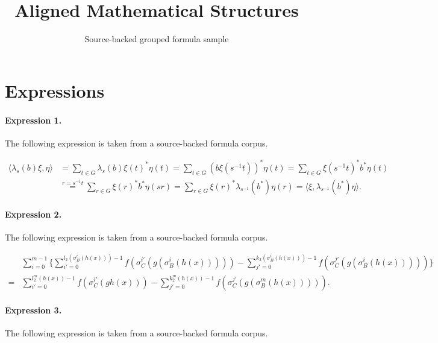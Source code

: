\documentclass[11pt]{article}
\title{Aligned Mathematical Structures}
\author{Source-backed grouped formula sample}
\date{}
\begin{document}
\maketitle
\section{Expressions}
\paragraph{Expression 1.} The following expression is taken from a source-backed formula corpus.

\begin{align*}\langle\lambda_s(b)\xi,\eta\rangle&=\sum_{t\in G}\lambda_s(b)\xi(t)^*\eta(t)=\sum_{t\in G}(b\xi(s^{-1}t))^*\eta(t)=\sum_{t\in G}\xi(s^{-1}t)^*b^*\eta(t)\\&\stackrel{r=s^{-1}t}{=}\sum_{r\in G}\xi(r)^*b^*\eta(sr)=\sum_{r\in G}\xi(r)^*\lambda_{s^{-1}}(b^*)\eta(r)=\langle\xi, \lambda_{s^{-1}}(b^*)\eta\rangle.\end{align*}

\paragraph{Expression 2.} The following expression is taken from a source-backed formula corpus.

\begin{align*}& \sum_{i=0}^{m-1} \{\sum_{i'=0}^{l_2 (\sigma_B^i(h(x)))-1} f(\sigma_C^{i'}(g(\sigma_B^i(h(x)))))-\sum_{j'=0}^{k_2 (\sigma_B^i(h(x)))-1} f(\sigma_C^{j'}(g(\sigma_B^{i}(h(x))))) \}\\=&\sum_{i'=0}^{l_2^m (h(x))-1} f(\sigma_C^{i'}(gh(x)))-\sum_{j'=0}^{k_2^m (h(x))-1} f(\sigma_C^{j'}(g(\sigma_B^{m}(h(x))))).\end{align*}

\paragraph{Expression 3.} The following expression is taken from a source-backed formula corpus.
\end{document}
